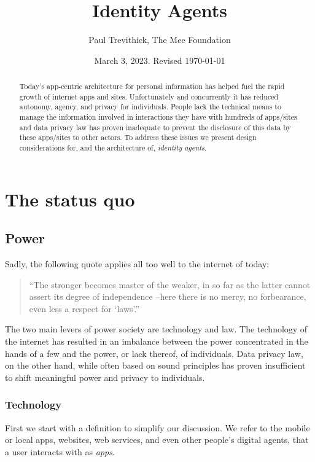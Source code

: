 \documentclass[11pt, oneside]{article}   	%
\title{Identity Agents}
\author{Paul Trevithick, The Mee Foundation}
\date{March 3, 2023. Revised \today}
\begin{document}
\maketitle
\begin{abstract}
Today's app-centric architecture for personal information has helped fuel the rapid growth of internet apps and sites. Unfortunately and concurrently it has reduced autonomy, agency, and privacy for individuals. People lack the technical means to manage the information involved in interactions they have with hundreds of apps/sites and data privacy law has proven inadequate to prevent the disclosure of this data by these apps/sites to other actors. To address these issues we present design considerations for, and the architecture of, \emph{identity agents}.
\end{abstract}


\section{The status quo} %

\subsection{Power}

Sadly, the following quote applies all too well to the internet of today:

\begin{quote}
	``The stronger becomes master of the weaker, in so far as the latter cannot assert its degree of independence --here there is no mercy, no forbearance, even less a respect for `laws'.''\cite{Nietzsche1901}
\end{quote}

The two main levers of power society are technology and law. The technology of the internet has resulted in an imbalance between the power concentrated in the hands of a few and the power, or lack thereof, of individuals. Data privacy law, on the other hand, while often based on sound principles has proven insufficient to shift meaningful power and privacy to individuals.

\subsubsection{Technology}
First we start with a definition to simplify our discussion. We refer to the mobile or local apps, websites, web services, and even other people's digital agents, that a user interacts with as \emph{apps}. 
\end{document}
